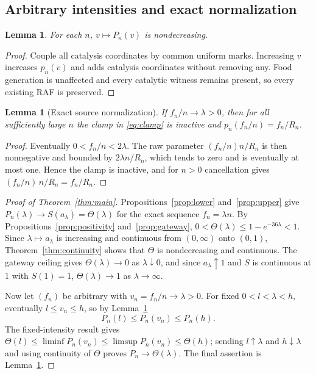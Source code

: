 \documentclass[11pt,reqno]{amsart}
\theoremstyle{plain}
\newtheorem{lemma}[theorem]{Lemma}
\theoremstyle{definition}
\theoremstyle{remark}
\numberwithin{equation}{section}
\newcommand{\clam}{a_\lambda}
\begin{document}
\subsection{Arbitrary intensities and exact normalization}

\begin{lemma}\label{lem:mono}
For each $n$, $v\mapsto P_n(v)$ is nondecreasing.
\end{lemma}

\begin{proof}
Couple all catalysis coordinates by common uniform marks. Increasing $v$ increases $p_n(v)$ and adds catalysis coordinates without removing any. Food generation is unaffected and every catalytic witness remains present, so every existing RAF is preserved.
\end{proof}

\begin{lemma}[Exact source normalization]\label{lem:clamp}
If $f_n/n\to\lambda>0$, then for all sufficiently large $n$ the clamp in \eqref{eq:clamp} is inactive and $p_n(f_n/n)=f_n/R_n$.
\end{lemma}

\begin{proof}
Eventually $0<f_n/n<2\lambda$. The raw parameter $(f_n/n)n/R_n$ is then nonnegative and bounded by $2\lambda n/R_n$, which tends to zero and is eventually at most one. Hence the clamp is inactive, and for $n>0$ cancellation gives $(f_n/n)\,n/R_n=f_n/R_n$.
\end{proof}

\begin{proof}[Proof of Theorem~\ref{thm:main}]
Propositions~\ref{prop:lower} and~\ref{prop:upper} give $P_n(\lambda)\to S(\clam)=\Theta(\lambda)$ for the exact sequence $f_n=\lambda n$. By Propositions~\ref{prop:positivity} and~\ref{prop:gateway}, $0<\Theta(\lambda)\le1-e^{-36\lambda}<1$. Since $\lambda\mapsto\clam$ is increasing and continuous from $(0,\infty)$ onto $(0,1)$, Theorem~\ref{thm:continuity} shows that $\Theta$ is nondecreasing and continuous. The gateway ceiling gives $\Theta(\lambda)\to0$ as $\lambda\downarrow0$, and since $\clam\uparrow1$ and $S$ is continuous at $1$ with $S(1)=1$, $\Theta(\lambda)\to1$ as $\lambda\to\infty$.

Now let $(f_n)$ be arbitrary with $v_n=f_n/n\to\lambda>0$. For fixed $0<l<\lambda<h$, eventually $l\le v_n\le h$, so by Lemma~\ref{lem:mono}
\begin{equation}\label{eq:squeeze}
P_n(l)\le P_n(v_n)\le P_n(h).
\end{equation}
The fixed-intensity result gives $\Theta(l)\le\liminf P_n(v_n)\le\limsup P_n(v_n)\le\Theta(h)$; sending $l\uparrow\lambda$ and $h\downarrow\lambda$ and using continuity of $\Theta$ proves $P_n\to\Theta(\lambda)$. The final assertion is Lemma~\ref{lem:clamp}.
\end{proof}
\end{document}

